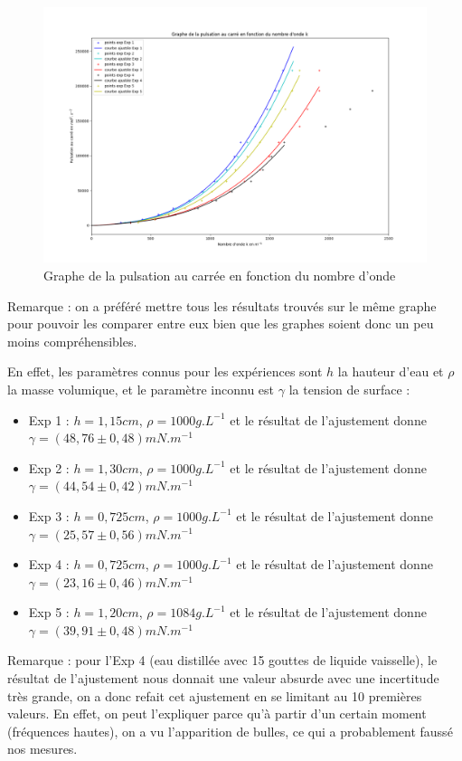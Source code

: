 \documentclass{report}
\begin{document}
\begin{figure}[H]
    \centering
    \includegraphics[scale=0.45]{graphe2.png}
    \caption{Graphe de la pulsation au carrée en fonction du nombre d'onde}
    \label{fig:enter-label}
\end{figure}

Remarque : on a préféré mettre tous les résultats trouvés sur le même graphe pour pouvoir les comparer entre eux bien que les graphes soient donc un peu moins compréhensibles.


En effet, les paramètres connus pour les expériences sont $h$ la hauteur d'eau et $\rho$ la masse volumique, et le paramètre inconnu est $\gamma$ la tension de surface :
\begin{itemize}[label=]
    \item Exp 1 : $h = 1,15 cm$, $\rho = 1 000 g.L^{-1}$ et le résultat de l'ajustement donne  $\gamma =  (48,76 \pm 0,48) mN.m^{-1}$
    \item Exp 2 : $h = 1,30 cm$, $\rho = 1 000 g.L^{-1}$ et le résultat de l'ajustement donne  $\gamma = (44,54 \pm 0,42) mN.m^{-1}$
    \item Exp 3 : $h = 0,725 cm$, $\rho = 1 000 g.L^{-1}$ et le résultat de l'ajustement donne  $\gamma = (25,57 \pm 0,56) mN.m^{-1}$
    \item Exp 4 : $h = 0,725 cm$, $\rho = 1 000 g.L^{-1}$ et le résultat de l'ajustement donne $\gamma = (23,16 \pm 0,46) mN.m^{-1}$
    \item Exp 5 : $h = 1,20 cm$, $\rho = 1 084 g.L^{-1}$ et le résultat de l'ajustement donne$\gamma = (39, 91 \pm 0, 48) mN.m^{-1}$
\end{itemize}

Remarque : pour l'Exp 4 (eau distillée avec 15 gouttes de liquide vaisselle), le résultat de l'ajustement nous donnait une valeur absurde avec une incertitude très grande, on a donc refait cet ajustement en se limitant au 10 premières valeurs. En effet, on peut l'expliquer parce qu'à partir d'un certain moment (fréquences hautes), on a vu l'apparition de bulles, ce qui a probablement faussé nos mesures.
\end{document}
